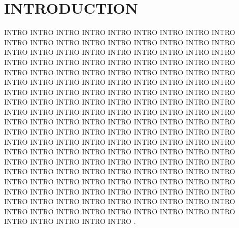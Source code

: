 \section{INTRODUCTION}

INTRO INTRO INTRO INTRO INTRO INTRO INTRO INTRO INTRO INTRO INTRO INTRO INTRO INTRO INTRO INTRO INTRO INTRO INTRO INTRO INTRO INTRO
INTRO INTRO INTRO INTRO INTRO INTRO INTRO INTRO INTRO INTRO INTRO INTRO INTRO INTRO INTRO INTRO INTRO INTRO INTRO INTRO INTRO INTRO
INTRO INTRO INTRO INTRO INTRO INTRO INTRO INTRO INTRO INTRO INTRO INTRO INTRO INTRO INTRO INTRO INTRO INTRO INTRO INTRO INTRO INTRO
INTRO INTRO INTRO INTRO INTRO INTRO INTRO INTRO INTRO INTRO INTRO INTRO INTRO INTRO INTRO INTRO INTRO INTRO INTRO INTRO INTRO INTRO
INTRO INTRO INTRO INTRO INTRO INTRO INTRO INTRO INTRO INTRO INTRO INTRO INTRO INTRO INTRO INTRO INTRO INTRO INTRO INTRO INTRO INTRO
INTRO INTRO INTRO INTRO INTRO INTRO INTRO INTRO INTRO INTRO INTRO INTRO INTRO INTRO INTRO INTRO INTRO INTRO INTRO INTRO INTRO INTRO
INTRO INTRO INTRO INTRO INTRO INTRO INTRO INTRO INTRO INTRO INTRO INTRO INTRO INTRO INTRO INTRO INTRO INTRO INTRO INTRO INTRO INTRO
INTRO INTRO INTRO INTRO INTRO INTRO INTRO INTRO INTRO INTRO INTRO INTRO INTRO INTRO INTRO INTRO INTRO INTRO INTRO INTRO INTRO INTRO \cite{Hello}.
